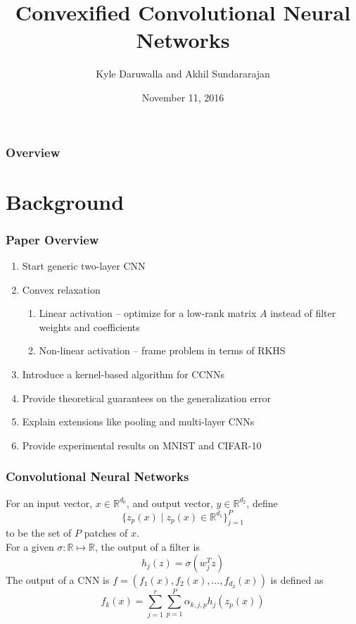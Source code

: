 \documentclass[hyperref={colorlinks}]{beamer}
\title[ECE 901 Paper Presentation]{Convexified Convolutional Neural Networks} %
\author{Kyle Daruwalla and Akhil Sundararajan}
\institute[UW-Madison]{ECE 901 Fall 2016}
\date{November 11, 2016}
\newcommand{\set}[1]{\mathbb{#1}}
\begin{document}
\begin{frame}
	\titlepage
\end{frame}

\begin{frame}
	\frametitle{Overview}
	\tableofcontents
\end{frame}


\section{Background}
\begin{frame}
	\frametitle{Paper Overview}
	\begin{enumerate}
		\item Start generic two-layer CNN
		\item Convex relaxation
		\begin{enumerate}
			\item Linear activation -- optimize for a low-rank matrix $A$ instead of filter weights and coefficients
			\item Non-linear activation -- frame problem in terms of RKHS
		\end{enumerate}
		\item Introduce a kernel-based algorithm for CCNNs
		\item Provide theoretical guarantees on the generalization error
		\item Explain extensions like pooling and multi-layer CNNs
		\item Provide experimental results on MNIST and CIFAR-10
	\end{enumerate}
\end{frame}

\begin{frame}
	\frametitle{Convolutional Neural Networks}
	For an input vector, $x \in \set{R}^{d_0}$, and output vector, $y \in \set{R}^{d_2}$, define
	$$\{z_p(x) \mid z_p(x) \in \set{R}^{d_1}\}_{j = 1}^P$$
	to be the set of $P$ patches of $x$. \\
	For a given $\sigma: \set{R} \mapsto \set{R}$, the output of a filter is
	$$h_j(z) = \sigma(w_j^T z)$$
	The output of a CNN is $f = (f_1(x), f_2(x), \ldots, f_{d_2}(x))$ is defined as
	\begin{equation}
		f_k(x) = \sum_{j = 1}^r \sum_{p = 1}^P \alpha_{k, j, p} h_j(z_p(x))
		\label{eq:cnn-output}
	\end{equation}
\end{frame}
\end{document}
